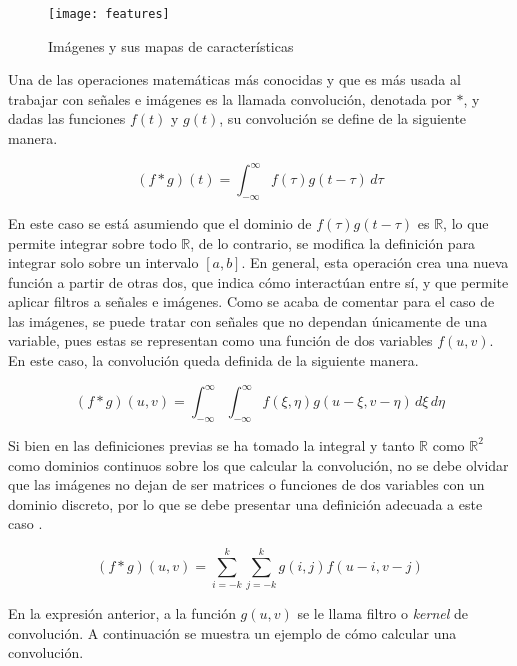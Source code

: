 			\begin{figure}[!h]
				\centering
				\texttt{[image: features]}
				\caption{Imágenes y sus mapas de características \cite{features}}
				\label{fig:features}
			\end{figure}
			
			Una de las operaciones matemáticas más conocidas y que es más usada al trabajar con señales e imágenes es la llamada convolución, denotada por $\ast$, y dadas las funciones $f(t)$ y $g(t)$, su convolución se define de la siguiente manera. 
			
			$$
			(f \ast g)(t) = \int_{-\infty}^\infty f(\tau)g(t - \tau)\,d\tau
			$$
			
			En este caso se está asumiendo que el dominio de $f(\tau)g(t - \tau)$ es $\mathbb{R}$, lo que permite integrar sobre todo $\mathbb{R}$, de lo contrario, se modifica la definición para integrar solo sobre un intervalo $[a, b]$. En general, esta operación crea una nueva función a partir de otras dos, que indica cómo interactúan entre sí, y que permite aplicar filtros a señales e imágenes. Como se acaba de comentar para el caso de las imágenes, se puede tratar con señales que no dependan únicamente de una variable, pues estas se representan como una función de dos variables $f(u, v)$. En este caso, la convolución queda definida de la siguiente manera. 
			
			$$
			(f \ast g)(u, v) = \int_{-\infty}^\infty\int_{-\infty}^\infty f(\xi, \eta)g(u - \xi, v - \eta)\,d\xi\,d\eta
			$$
			
			Si bien en las definiciones previas se ha tomado la integral y tanto $\mathbb{R}$ como $\mathbb{R}^2$ como dominios continuos sobre los que calcular la convolución, no se debe olvidar que las imágenes no dejan de ser matrices o funciones de dos variables con un dominio discreto, por lo que se debe presentar una definición adecuada a este caso \cite{Goodfellow-et-al-2016}. 
			
			$$
			(f \ast g)(u, v) = \sum_{i=-k}^{k}\sum_{j=-k}^{k} g(i, j)f(u - i, v - j)
			$$
			
			En la expresión anterior, a la función $g(u, v)$ se le llama filtro o \textit{kernel} de convolución. A continuación se muestra un ejemplo de cómo calcular una convolución. 
			
